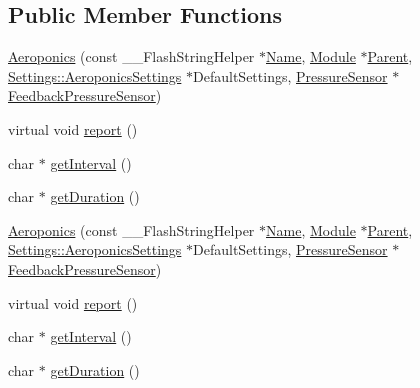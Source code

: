 \subsection*{Public Member Functions}
\begin{DoxyCompactItemize}
\item 
\hyperlink{class_aeroponics_aa0ded2d62059e82009548ccfa9c1f790}{Aeroponics} (const \+\_\+\+\_\+\+Flash\+String\+Helper $\ast$\hyperlink{class_common_aeea91a726dbe988e515057b32ba0726f}{Name}, \hyperlink{class_module}{Module} $\ast$\hyperlink{class_aeroponics_aa6bca341181caaa3ef15d10512d24c7b}{Parent}, \hyperlink{struct_settings_1_1_aeroponics_settings}{Settings\+::\+Aeroponics\+Settings} $\ast$Default\+Settings, \hyperlink{class_pressure_sensor}{Pressure\+Sensor} $\ast$\hyperlink{class_aeroponics_ab5e9a2fe86a36e1e84876eb1366a2bfb}{Feedback\+Pressure\+Sensor})
\item 
virtual void \hyperlink{class_aeroponics_a3dbfce027ab5fa736a6007a6ae75ee4e}{report} ()
\item 
char $\ast$ \hyperlink{class_aeroponics_af5c051ee5e24b10644d70d5e5a2b82b7}{get\+Interval} ()
\item 
char $\ast$ \hyperlink{class_aeroponics_acd7c1402fad8a71c4f0ee4b15f27497d}{get\+Duration} ()
\item 
\hyperlink{class_aeroponics_aa0ded2d62059e82009548ccfa9c1f790}{Aeroponics} (const \+\_\+\+\_\+\+Flash\+String\+Helper $\ast$\hyperlink{class_common_aeea91a726dbe988e515057b32ba0726f}{Name}, \hyperlink{class_module}{Module} $\ast$\hyperlink{class_aeroponics_aa6bca341181caaa3ef15d10512d24c7b}{Parent}, \hyperlink{struct_settings_1_1_aeroponics_settings}{Settings\+::\+Aeroponics\+Settings} $\ast$Default\+Settings, \hyperlink{class_pressure_sensor}{Pressure\+Sensor} $\ast$\hyperlink{class_aeroponics_ab5e9a2fe86a36e1e84876eb1366a2bfb}{Feedback\+Pressure\+Sensor})
\item 
virtual void \hyperlink{class_aeroponics_a1da64fbd59c3452422fdaaf794dfa8be}{report} ()
\item 
char $\ast$ \hyperlink{class_aeroponics_a8b412b9988ce3ceae617dc53502e6d12}{get\+Interval} ()
\item 
char $\ast$ \hyperlink{class_aeroponics_ae884337e59b46b5ff0fdb3b5da5dc5a0}{get\+Duration} ()
\end{DoxyCompactItemize}
